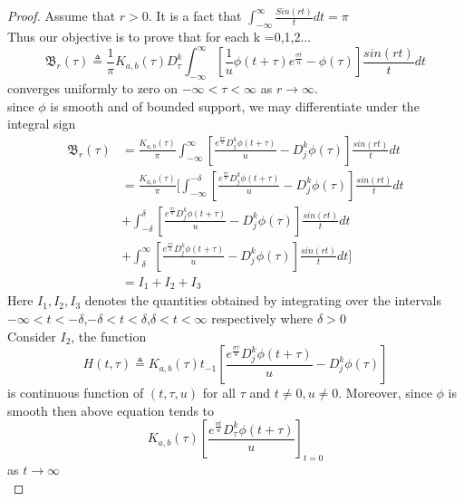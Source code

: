  \begin{proof}
 
 Assume that $ r > 0 $. It is a fact that $ \int_{-\infty}^{\infty}\frac{Sin(rt)}{t}dt = \pi $ \\
 Thus our objective is to prove that for each k =0,1,2...
 \begin{equation}
 \mathfrak{B}_{r}(\tau)\triangleq \frac{1}{\pi}K_{a,b}(\tau) D_{\tau}^{k}\int_{-\infty}^{\infty}[\frac{1}{u}\phi(t+\tau)e^{\frac{\sigma t}{u}}-\phi(\tau)]\frac{sin(rt)}{t}dt
 \end{equation}
 converges uniformly to zero on $ -\infty <\tau < \infty  $ as $ r \rightarrow \infty $.\\
 since $ \phi $ is smooth and of bounded support, we may differentiate under the integral sign
 \begin{align*}
 \mathfrak{B}_{r}(\tau)& = \frac{K_{a,b}(\tau)}{\pi} \int_{-\infty}^{\infty}[\frac{e^{\frac{\sigma \tau}{u}}D_{j}^{k}\phi(t+\tau)}{u}-D_{j}^{k}\phi(\tau)]\frac{sin(rt)}{t}dt\\
 &= \frac{K_{a,b}(\tau)}{\pi} [\int_{-\infty}^{-\delta}[\frac{e^{\frac{\sigma \tau}{u}}D_{j}^{k}\phi(t+\tau)}{u}-D_{j}^{k}\phi(\tau)]\frac{sin(rt)}{t}dt \\
 &+\int_{-\delta}^{\delta}[\frac{e^{\frac{\sigma \tau}{u}}D_{j}^{k}\phi(t+\tau)}{u}- D_{j}^{k}\phi(\tau)]\frac{sin(rt)}{t}dt\\
 &+\int_{\delta}^{\infty}[\frac{e^{\frac{\sigma \tau}{u}}D_{j}^{k}\phi(t+\tau)}{u}-D_{j}^{k}\phi(\tau)]\frac{sin(rt)}{t}dt]\\
 &= I_{1}+I_{2}+I_{3}
 \end{align*}
 Here $ I_{1},I_{2},I_{3} $ denotes the quantities obtained by integrating over the intervals $ -\infty < t < -\delta $,$ -\delta < t < \delta $,$\delta < t < \infty $ respectively where $ \delta > 0 $\\
 Consider $ I_{2} $, the function
 \begin{equation}
 H(t,\tau)\triangleq K_{a,b}(\tau) t_{-1}[\frac{e^{\frac{\sigma \tau}{u}}D_{j}^{k}\phi(t+\tau)}{u}-D_{j}^{k}\phi(\tau)]
 \end{equation}
 is continuous function of $ (t,\tau,u) $ for all $ \tau $ and $ t\neq 0, u\neq 0 $. Moreover, since $ \phi $ is smooth then above equation tends to
 \begin{equation}
 K_{a,b}(\tau)[\frac{e^{\frac{\sigma t}{u}}D_{\tau}^{k}\phi(t+\tau)}{u}]_{t=0}
\end{equation} 
 as $ t \rightarrow \infty $\\

\end{proof}

